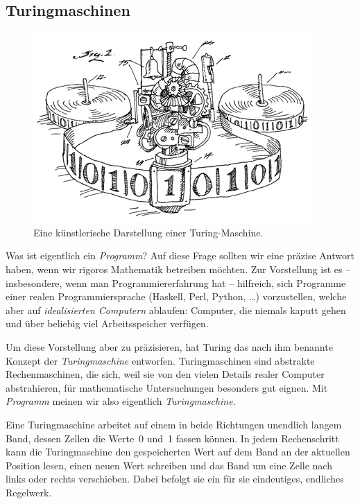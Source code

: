 \documentclass[twoside]{../zirkelblatt1415}
\theoremstyle{definition}
\theoremstyle{plain}
\theoremstyle{remark}
\begin{document}
\subsection{Turingmaschinen}

\setlength{\wrapoverhang}{1cm}
\setlength{\columnsep}{0.5cm}
\begin{figure}
  \vspace{-3em}
  \includegraphics[scale=0.3]{turing-machine}
  \scriptsize
  Eine künstlerische Darstellung einer
  Turing-Maschine.\footnotemark
\end{figure}

Was ist eigentlich ein \emph{Programm}? Auf diese Frage sollten wir eine
präzise Antwort haben, wenn wir rigoros Mathematik betreiben möchten. Zur
Vorstellung ist es -- insbesondere, wenn man Programmiererfahrung hat --
hilfreich, sich Programme einer realen Programmiersprache (Haskell, Perl,
Python, \ldots) vorzustellen, welche aber auf \emph{idealisierten Computern}
ablaufen: Computer, die niemals kaputt gehen und über beliebig viel
Arbeitsspeicher verfügen.

Um diese Vorstellung aber zu präzisieren, hat Turing das nach ihm benannte
Konzept der \emph{Turingmaschine} entworfen. Turingmaschinen sind abstrakte
Rechenmaschinen, die sich, weil sie von den vielen Details realer Computer
abstrahieren, für mathematische Untersuchungen besonders gut eignen. Mit
\emph{Programm} meinen wir also eigentlich \emph{Turingmaschine}.

Eine Turingmaschine arbeitet auf einem in beide Richtungen unendlich langem
Band, dessen Zellen die Werte~0 und~1 fassen können.
In jedem Rechenschritt kann die
Turingmaschine den gespeicherten Wert auf dem Band an der aktuellen Position
lesen, einen neuen Wert schreiben und das Band um eine Zelle nach links oder
rechts verschieben. Dabei befolgt sie ein für sie eindeutiges, endliches
Regelwerk.
\end{document}
